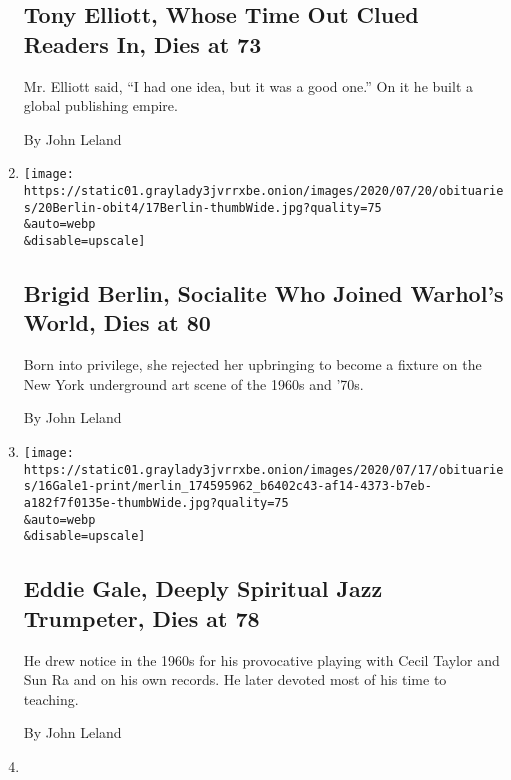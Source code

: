 \begin{enumerate}
{  \subsection{Tony Elliott, Whose Time Out Clued Readers In, Dies at
  73}\label{tony-elliott-whose-time-out-clued-readers-in-dies-at-73}}

  Mr. Elliott said, ``I had one idea, but it was a good one.'' On it he
  built a global publishing empire.

  By John Leland
\item
  \href{/2020/07/18/arts/brigid-berlin-dead.html}{}

  \texttt{[image: https://static01.graylady3jvrrxbe.onion/images/2020/07/20/obituaries/20Berlin-obit4/17Berlin-thumbWide.jpg?quality=75\\\&auto=webp\\\&disable=upscale]}

  \hypertarget{brigid-berlin-socialite-who-joined-warhols-world-dies-at-80}{%
  \subsection{Brigid Berlin, Socialite Who Joined Warhol's World, Dies
  at
  80}\label{brigid-berlin-socialite-who-joined-warhols-world-dies-at-80}}

  Born into privilege, she rejected her upbringing to become a fixture
  on the New York underground art scene of the 1960s and '70s.

  By John Leland
\item
  \href{/2020/07/16/arts/music/eddie-gale-dead.html}{}

  \texttt{[image: https://static01.graylady3jvrrxbe.onion/images/2020/07/17/obituaries/16Gale1-print/merlin\_174595962\_b6402c43-af14-4373-b7eb-a182f7f0135e-thumbWide.jpg?quality=75\\\&auto=webp\\\&disable=upscale]}

  \hypertarget{eddie-gale-deeply-spiritual-jazz-trumpeter-dies-at-78}{%
  \subsection{Eddie Gale, Deeply Spiritual Jazz Trumpeter, Dies at
  78}\label{eddie-gale-deeply-spiritual-jazz-trumpeter-dies-at-78}}

  He drew notice in the 1960s for his provocative playing with Cecil
  Taylor and Sun Ra and on his own records. He later devoted most of his
  time to teaching.

  By John Leland
\item
  \href{/2020/07/15/us/vickey-gibbs-dead-coronavirus.html}{}


\end{enumerate}
